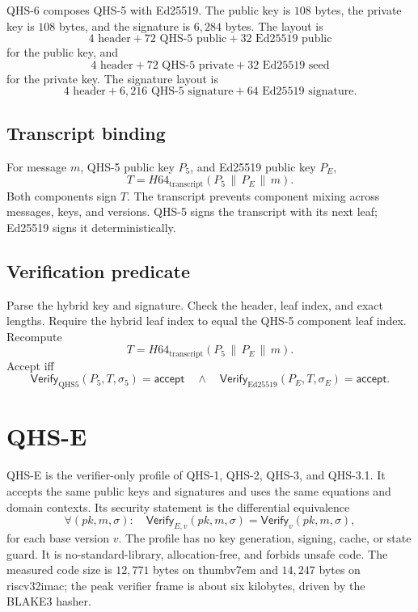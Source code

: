 \documentclass[11pt,a4paper]{article}
\theoremstyle{remark}
\newcommand{\Ver}{\mathsf{Verify}}
\newcommand{\acc}{\mathsf{accept}}
\newcommand{\concat}{\,\|\,}
\begin{document}
QHS-6 composes QHS-5 with Ed25519. The public key is \(108\) bytes, the private
key is \(108\) bytes, and the signature is \(6{,}284\) bytes. The layout is
\[
4\text{ header}+72\text{ QHS-5 public}+32\text{ Ed25519 public}
\]
for the public key, and
\[
4\text{ header}+72\text{ QHS-5 private}+32\text{ Ed25519 seed}
\]
for the private key. The signature layout is
\[
4\text{ header}+6{,}216\text{ QHS-5 signature}+64\text{ Ed25519 signature}.
\]

\subsection{Transcript binding}

For message \(m\), QHS-5 public key \(P_5\), and Ed25519 public key \(P_E\),
\[
T=H64_{\text{transcript}}(P_5\concat P_E\concat m).
\]
Both components sign \(T\). The transcript prevents component mixing across
messages, keys, and versions. QHS-5 signs the transcript with its next leaf;
Ed25519 signs it deterministically.

\subsection{Verification predicate}

Parse the hybrid key and signature. Check the header, leaf index, and exact
lengths. Require the hybrid leaf index to equal the QHS-5 component leaf index.
Recompute
\[
T=H64_{\text{transcript}}(P_5\concat P_E\concat m).
\]
Accept iff
\[
\Ver_{\mathrm{QHS5}}(P_5,T,\sigma_5)=\acc
\quad\wedge\quad
\Ver_{\mathrm{Ed25519}}(P_E,T,\sigma_E)=\acc.
\]

\section{QHS-E}

QHS-E is the verifier-only profile of QHS-1, QHS-2, QHS-3, and QHS-3.1. It
accepts the same public keys and signatures and uses the same equations and
domain contexts. Its security statement is the differential equivalence
\[
\forall (pk,m,\sigma):\quad
\Ver_{E,v}(pk,m,\sigma)=\Ver_{v}(pk,m,\sigma),
\]
for each base version \(v\). The profile has no key generation, signing, cache,
or state guard. It is no-standard-library, allocation-free, and forbids unsafe
code. The measured code size is \(12{,}771\) bytes on thumbv7em and \(14{,}247\)
bytes on riscv32imac; the peak verifier frame is about six kilobytes, driven by
the BLAKE3 hasher.
\end{document}
